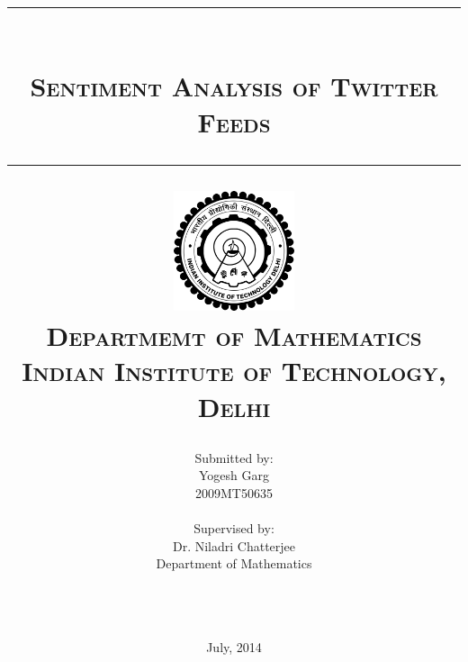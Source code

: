 \title{
	\rule{0.9\textwidth}{.4pt}\\ \vspace{10pt}
	\textsc{
		Sentiment Analysis of Twitter Feeds
	}\\
	\rule{0.9\textwidth}{.4pt}
\vfill
	\includegraphics[height=100pt]{img/iitd_logo.png}\\
\vspace{10pt}
	\textsc{\Large{
		Departmemt of Mathematics\\
		Indian Institute of Technology, Delhi
	}}
\vspace{100pt}
}

\author{
\begin{minipage}{0.5\textwidth}\centering
	\small{Submitted by:}\\
	Yogesh Garg\\
	\small{2009MT50635}\\
\end{minipage}\begin{minipage}{0.5\textwidth}\centering
	\small{Supervised by:}\\
	Dr. Niladri Chatterjee\\
	\small{Department of Mathematics}\\
\end{minipage}\\
	\rule{0.9\textwidth}{.4pt}
}

\date{July, 2014}

\clearpage\maketitle
\thispagestyle{empty}
\setcounter{page}{0}